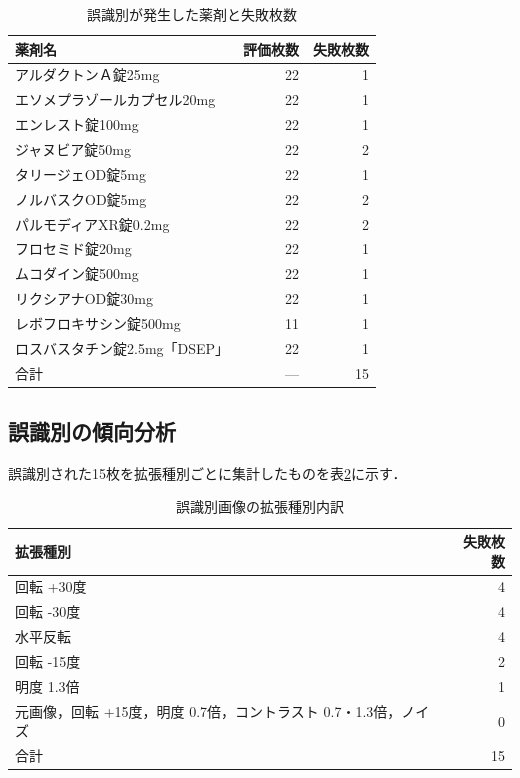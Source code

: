 \documentclass{jsarticle}
\begin{document}
\begin{table}[h]
\centering
\caption{誤識別が発生した薬剤と失敗枚数}
\label{tab:failed_drugs}
\small
\begin{tabular}{lrr}
\hline
薬剤名 & 評価枚数 & 失敗枚数 \\
\hline
アルダクトンＡ錠25mg & 22 & 1 \\
エソメプラゾールカプセル20mg & 22 & 1 \\
エンレスト錠100mg & 22 & 1 \\
ジャヌビア錠50mg & 22 & 2 \\
タリージェOD錠5mg & 22 & 1 \\
ノルバスクOD錠5mg & 22 & 2 \\
パルモディアXR錠0.2mg & 22 & 2 \\
フロセミド錠20mg & 22 & 1 \\
ムコダイン錠500mg & 22 & 1 \\
リクシアナOD錠30mg & 22 & 1 \\
レボフロキサシン錠500mg & 11 & 1 \\
ロスバスタチン錠2.5mg「DSEP」 & 22 & 1 \\
\hline
合計 & --- & 15 \\
\hline
\end{tabular}
\end{table}

\subsection{誤識別の傾向分析}

誤識別された15枚を拡張種別ごとに集計したものを表\ref{tab:failed_aug}に示す．

\begin{table}[h]
\centering
\caption{誤識別画像の拡張種別内訳}
\label{tab:failed_aug}
\begin{tabular}{lr}
\hline
拡張種別 & 失敗枚数 \\
\hline
回転 +30度 & 4 \\
回転 -30度 & 4 \\
水平反転 & 4 \\
回転 -15度 & 2 \\
明度 1.3倍 & 1 \\
元画像，回転 +15度，明度 0.7倍，コントラスト 0.7・1.3倍，ノイズ & 0 \\
\hline
合計 & 15 \\
\hline
\end{tabular}
\end{table}
\end{document}
